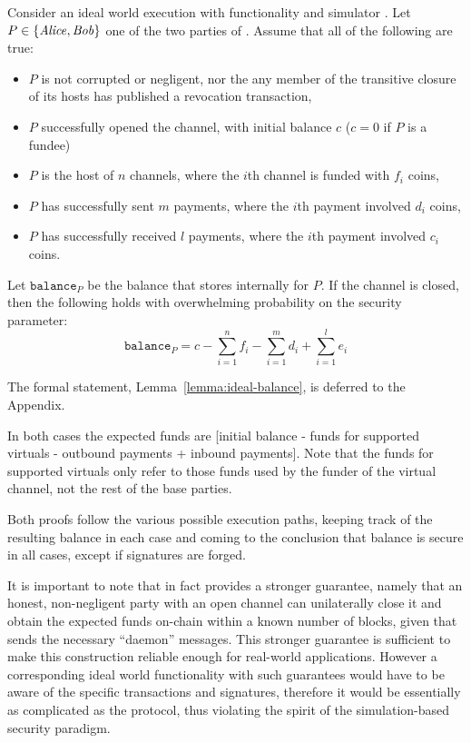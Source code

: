 \begin{lemma}
\label{lemma:ideal-balance-informal}
  Consider an ideal world execution with functionality \fchan and simulator
  \simulator. Let $P \in \{\mathit{Alice}, \mathit{Bob}\}$ one of the two parties of \fchan.
  Assume that all of the following are true:
  \begin{itemize}
    \item $P$ is not corrupted or negligent, nor the any member of the
    transitive closure of its hosts has published a revocation transaction,
    \item $P$ successfully opened the channel, with initial balance $c$ ($c = 0$
    if $P$ is a fundee)
    \item $P$ is the host of $n$ channels, where the $i$th channel is funded
    with $f_i$ coins,
    \item $P$ has successfully sent $m$ payments, where the $i$th payment
    involved $d_i$ coins,
    \item $P$ has successfully received $l$ payments, where the $i$th payment
    involved $c_i$ coins.
  \end{itemize}
  Let $\texttt{balance}_P$ be the balance that \fchan stores internally for $P$.
  If the channel is closed, then the following holds with overwhelming
  probability on the security parameter:
  \begin{equation}
    \texttt{balance}_P = c - \sum\limits_{i=1}^n f_i -
    \sum\limits_{i=1}^m d_i + \sum\limits_{i=1}^l e_i
  \end{equation}
\end{lemma}
The formal statement, Lemma~\ref{lemma:ideal-balance}, is deferred to the
Appendix.

  In both cases the expected funds are [initial balance -
  funds for supported virtuals - outbound payments + inbound payments]. Note
  that the funds for supported virtuals only refer to those funds used by the
  funder of the virtual channel, not the rest of the base parties.

  Both proofs follow the various possible execution paths, keeping track of the
  resulting balance in each case and coming to the conclusion that balance is
  secure in all cases, except if signatures are forged.

  It is important to note that in fact \pchan provides a stronger guarantee,
  namely that an honest, non-negligent party with an open channel can
  unilaterally close it and obtain the expected funds on-chain within a known
  number of blocks, given that \environment sends the necessary ``daemon'' messages.
  This stronger guarantee is sufficient to make this construction reliable
  enough for real-world applications. However a corresponding ideal world
  functionality with such guarantees would have to be aware of the specific
  transactions and signatures, therefore it would be essentially as complicated
  as the protocol, thus violating the spirit of the simulation-based security
  paradigm.

